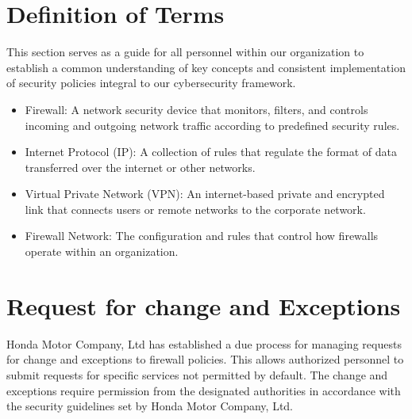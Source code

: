 \section{Definition of Terms}
This section serves as a guide for all personnel within our organization to establish a common understanding of key concepts and consistent implementation of security policies integral to our cybersecurity framework. 
\begin{itemize}
    \item Firewall: A network security device that monitors, filters, and controls incoming and outgoing network traffic according to predefined security rules.
    \item Internet Protocol (IP): A collection of rules that regulate the format of data transferred over the internet or other networks.
    \item Virtual Private Network (VPN): An internet-based private and encrypted link that connects users or remote networks to the corporate network.
    \item Firewall Network: The configuration and rules that control how firewalls operate within an organization.
\end{itemize}




\section{Request for change and Exceptions}
Honda Motor Company, Ltd has established a due process for managing requests for change and exceptions to firewall policies. This allows authorized personnel to submit requests for specific services not permitted by default. The change and exceptions require permission from the designated authorities in accordance with the security guidelines set by Honda Motor Company, Ltd. 


